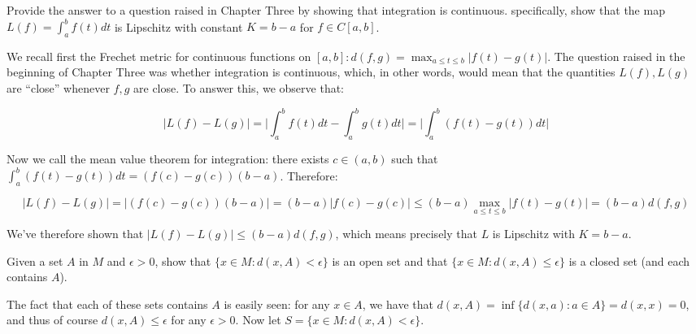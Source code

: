 \begin{exercise}{26}
    Provide the answer to a question raised in Chapter Three by showing that integration is continuous.
    specifically, show that the map $L(f) = \int_{a}^{b} f(t) dt$ is Lipschitz with constant $K = b - a$ for $f \in C[a, b]$.
\end{exercise}

\begin{solution}
    
    We recall first the Frechet metric for continuous functions on $[a, b]: d(f, g) = \max_{a \leq t \leq b} \lvert f(t) - g(t) \rvert$.
    The question raised in the beginning of Chapter Three was whether integration is continuous, which, in other words, would mean that the quantities $L(f), L(g)$ are ``close'' whenever $f, g$ are close.
    To answer this, we observe that:

    \[\lvert L(f) - L(g) \rvert = \Biggl\lvert \int_{a}^{b} f(t) dt - \int_{a}^{b} g(t) dt \Biggr\rvert = \Biggl\lvert \int_{a}^{b} (f(t) - g(t)) dt \Biggr\rvert\]

    Now we call the mean value theorem for integration: there exists $c \in (a, b)$ such that $\int_{a}^{b}(f(t) - g(t))dt = (f(c) - g(c))(b - a)$.
    Therefore:

    \[\lvert L(f) - L(g) \rvert = \lvert (f(c) - g(c))(b - a) \rvert = (b - a) \lvert f(c) - g(c) \rvert \leq (b - a) \max_{a \leq t \leq b} \lvert f(t) - g(t) \rvert = (b - a)d(f, g)\]
    
    We've therefore shown that $\lvert L(f) - L(g) \rvert \leq (b - a)d(f, g)$, which means precisely that $L$ is Lipschitz with $K = b - a$.
\end{solution}

\begin{exercise}{28}
    Given a set $A$ in $M$ and $\epsilon > 0$, show that $\{x \in M: d(x, A) < \epsilon\}$ is an open set and that $\{x \in M: d(x, A) \leq \epsilon\}$ is a closed set (and each contains $A$).
\end{exercise}

\begin{solution}
    
    The fact that each of these sets contains $A$ is easily seen: for any $x \in A$, we have that $d(x, A) = \inf\{d(x, a): a \in A\} = d(x, x) = 0$, and thus of course $d(x, A) \leq \epsilon$ for any $\epsilon > 0$.
    Now let $S = \{x \in M: d(x, A) < \epsilon\}$.
\end{solution}

